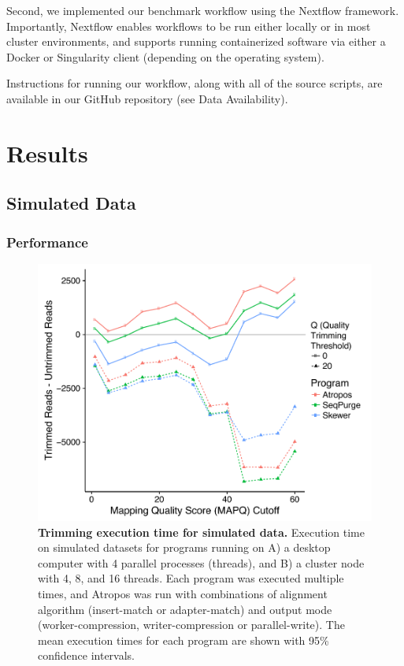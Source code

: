 \documentclass[fleqn,10pt,lineno]{wlpeerj} %
\begin{document}
Second, we implemented our benchmark workflow using the Nextflow \citep{DiTommaso2017Nextflow} framework. Importantly, Nextflow enables workflows to be run either locally or in most cluster environments, and supports running containerized software via either a Docker or Singularity \citep{Kurtzer2016Singularity} client (depending on the operating system).

Instructions for running our workflow, along with all of the source scripts, are available in our GitHub repository (see Data Availability).

\section{Results}\label{results}

\subsection{Simulated Data}

\subsubsection{Performance}

\begin{figure}[!ht]
\centering
\includegraphics[width=\linewidth]{Figure2.pdf}
\caption{\textbf{Trimming execution time for simulated data.} Execution time on simulated datasets for programs running on A) a desktop computer with 4 parallel processes (threads), and B) a cluster node with 4, 8, and 16 threads. Each program was executed multiple times, and Atropos was run with combinations of alignment algorithm (insert-match or adapter-match) and output mode (worker-compression, writer-compression or parallel-write). The mean execution times for each program are shown with 95\% confidence intervals.}
\label{fig:simulated-performance}
\end{figure}
\end{document}
